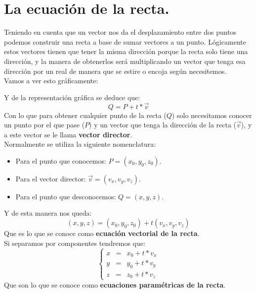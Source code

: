 \documentclass[a4paper,11pt,answers]{exam}
\begin{document}
\section{La ecuación de la recta.}
Teniendo en cuenta que un vector nos da el desplazamiento entre dos puntos podemos construir una recta a base de sumar vectores a un punto. Lógicamente estos vectores tienen que tener la misma dirección porque la recta solo tiene una dirección, y la manera de obtenerlos será multiplicando un vector que tenga esa dirección por un real de manera que se estire o encoja según necesitemos.\\
Vamos a ver esto gráficamente:
\begin{center}
\end{center}
Y de la representación gráfica se deduce que:
\[Q = P + t*\vec v\]
Con lo que para obtener cualquier punto de la recta ($Q$) solo necesitamos conocer un punto por el que pase ($P$) y un vector que tenga la dirección de la recta ($\vec v$), y a este vector se le llama \textbf{vector director}.\\

Normalmente se utiliza la siguiente nomenclatura:
\begin{itemize}
	\item Para el punto que conocemos: $P = (x_0, y_0, z_0)$.
	\item Para el vector director: $\vec v = (v_x, v_y, v_z)$.
	\item Para el punto que desconocemos: $Q = (x, y, z)$.
\end{itemize}

Y de esta manera nos queda:
\[(x,y,z) = (x_0, y_0, z_0) + t(v_x, v_y,v_z)\]
Que es lo que se conoce como \textbf{ecuación vectorial de la recta}.\\

Si separamos por componentes tendremos que:
\[\left\lbrace
\begin{array}{lcl}
x &=& x_0 + t*v_x\\
y &=& y_0 + t*v_y\\
z &=& z_0 + t*v_z
\end{array}
\right.\]
Que son lo que se conoce como \textbf{ecuaciones paramétricas de la recta}.\\
\end{document}
